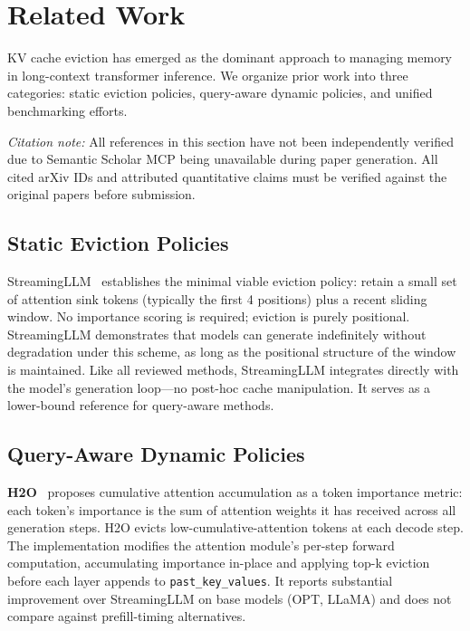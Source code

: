 \section{Related Work}
\label{sec:related}

KV cache eviction has emerged as the dominant approach to managing memory in long-context transformer inference. We organize prior work into three categories: static eviction policies, query-aware dynamic policies, and unified benchmarking efforts.

\emph{Citation note:} All references in this section have not been independently verified due to Semantic Scholar MCP being unavailable during paper generation. All cited arXiv IDs and attributed quantitative claims must be verified against the original papers before submission.

\subsection{Static Eviction Policies}

StreamingLLM~\cite{xiao2023streamingllm} establishes the minimal viable eviction policy: retain a small set of attention sink tokens (typically the first 4 positions) plus a recent sliding window. No importance scoring is required; eviction is purely positional. StreamingLLM demonstrates that models can generate indefinitely without degradation under this scheme, as long as the positional structure of the window is maintained. Like all reviewed methods, StreamingLLM integrates directly with the model's generation loop---no post-hoc cache manipulation. It serves as a lower-bound reference for query-aware methods.

\subsection{Query-Aware Dynamic Policies}

\textbf{H2O}~\cite{zhang2023h2o} proposes cumulative attention accumulation as a token importance metric: each token's importance is the sum of attention weights it has received across all generation steps. H2O evicts low-cumulative-attention tokens at each decode step. The implementation modifies the attention module's per-step forward computation, accumulating importance in-place and applying top-k eviction before each layer appends to \texttt{past\_key\_values}. It reports substantial improvement over StreamingLLM on base models (OPT, LLaMA) and does not compare against prefill-timing alternatives.


